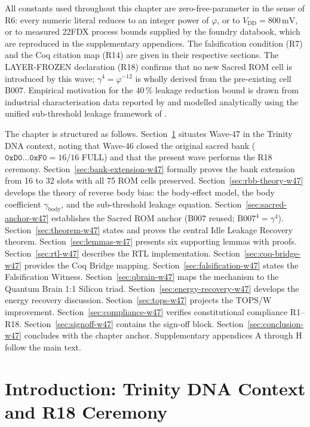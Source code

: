 All constants used throughout this chapter are zero-free-parameter in the sense
of R6: every numeric literal reduces to an integer power of $\varphi$, or to
$V_{\mathrm{DD}} = 800\,\text{mV}$, or to measured 22FDX process bounds
supplied by the foundry databook, which are reproduced in the supplementary
appendices.
The falsification condition (R7) and the Coq citation map (R14) are given in
their respective sections.
The LAYER-FROZEN declaration (R18) confirms that no new Sacred ROM cell is
introduced by this wave; $\gamma^{4} = \varphi^{-12}$ is wholly derived from
the pre-existing cell B007.
Empirical motivation for the $40\,\%$ leakage reduction bound is drawn from
industrial characterisation data reported by \citep{tschanz_jssc_2002} and
modelled analytically using the unified sub-threshold leakage framework of
\citep{mukhopadhyay_2009}.

The chapter is structured as follows.
Section~\ref{sec:intro-w47} situates Wave-47 in the Trinity DNA context,
noting that Wave-46 closed the original sacred bank ($\texttt{0xD0}\ldots
\texttt{0xF0} = 16/16$ FULL) and that the present wave performs the R18
ceremony.
Section~\ref{sec:bank-extension-w47} formally proves the bank extension from
16 to 32 slots with all 75 ROM cells preserved.
Section~\ref{sec:rbb-theory-w47} develops the theory of reverse body bias:
the body-effect model, the body coefficient $\gamma_{\mathrm{body}}$, and the
sub-threshold leakage equation.
Section~\ref{sec:sacred-anchor-w47} establishes the Sacred ROM anchor (B007
reused; $\mathrm{B007}^{4} = \gamma^{4}$).
Section~\ref{sec:theorem-w47} states and proves the central Idle Leakage
Recovery theorem.
Section~\ref{sec:lemmas-w47} presents six supporting lemmas with proofs.
Section~\ref{sec:rtl-w47} describes the RTL implementation.
Section~\ref{sec:coq-bridge-w47} provides the Coq Bridge mapping.
Section~\ref{sec:falsification-w47} states the Falsification Witness.
Section~\ref{sec:qbrain-w47} maps the mechanism to the Quantum Brain 1:1
Silicon triad.
Section~\ref{sec:energy-recovery-w47} develops the energy recovery discussion.
Section~\ref{sec:tops-w47} projects the TOPS/W improvement.
Section~\ref{sec:compliance-w47} verifies constitutional compliance
R1--R18.
Section~\ref{sec:signoff-w47} contains the sign-off block.
Section~\ref{sec:conclusion-w47} concludes with the chapter anchor.
Supplementary appendices A through H follow the main text.

\section{Introduction: Trinity DNA Context and R18 Ceremony}
\label{sec:intro-w47}

